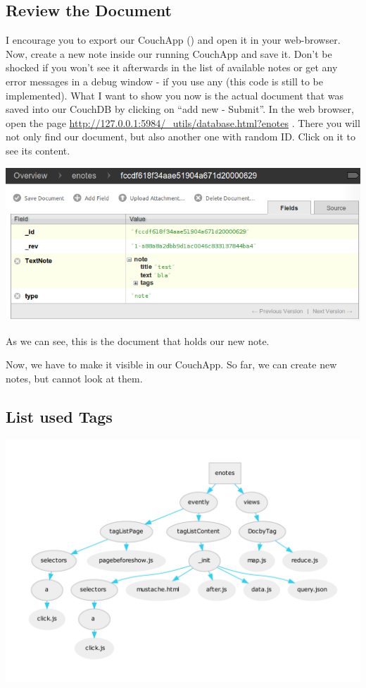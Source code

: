\documentclass[letterpaper,10pt,english]{sphinxmanual}
\begin{document}
\subsection{Review the Document}
\label{4-Logic:review-the-document}
I encourage you to export our CouchApp () and open it in your web-browser. Now, create a new note inside our running CouchApp and save it. Don't be shocked if you won't see it afterwards in the list of available notes or get any error messages in a debug window - if you use any (this code is still to be implemented). What I want to show you now is the actual document that was saved into our CouchDB by clicking on ``add new - Submit''.
In the web browser, open the page \href{http://127.0.0.1:5984/\_utils/database.html?enotes}{http://127.0.0.1:5984/\_utils/database.html?enotes} .
There you will not only find our  document, but also another one with random ID. Click on it to see its content.

\includegraphics{4_document.png}

As we can see, this is the document that holds our new note.

Now, we have to make it visible in our CouchApp. So far, we can create new notes, but cannot look at them.


\subsection{List used Tags}
\label{4-Logic:list-used-tags}
\includegraphics{graphviz-0073b2456451e7a0c5275945d8a5a28cdd86f1af.pdf}
\end{document}
